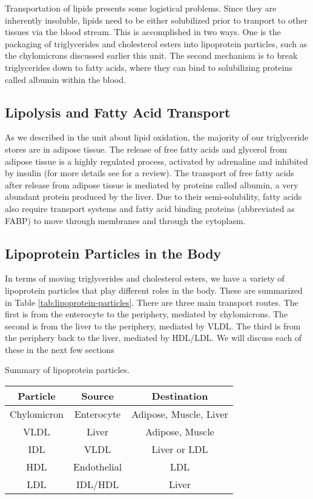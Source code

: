\documentclass{tufte-handout}
\begin{document}
Transportation of lipids presents some logistical problems.  Since they are inherently insoluble, lipids need to be either solubilized prior to tranport to other tissues via the blood stream.  This is accomplished in two ways.  One is the packaging of triglycerides and cholesterol esters into lipoprotein particles, such as the chylomicrons discussed earlier this unit.  The second mechanism is to break triglycerides down to fatty acids, where they can bind to solubilizing proteins called albumin within the blood.

\subsection{Lipolysis and Fatty Acid Transport}

As we described in the unit about lipid oxidation, the majority of our triglyceride stores are in adipose tissue.  The release of free fatty acids and glycerol from adipose tissue is a highly regulated process, activated by adrenaline and inhibited by insulin (for more details see \citet{Zechner2012} for a review).  The transport of free fatty acids after release from adipose tissue is mediated by proteins called albumin, a very abundant protein produced by the liver.  Due to their semi-solubility, fatty acids also require transport systems and fatty acid binding proteins (abbreviated as FABP) to move through membranes and through the cytoplasm.


\subsection{Lipoprotein Particles in the Body}

In terms of moving triglycerides and cholesterol esters, we have a variety of lipoprotein particles that play different roles in the body.  These are summarized in Table \ref{tab:lipoprotein-particles}.  There are three main transport routes.  The first is from the enterocyte to the periphery, mediated by chylomicrons.  The second is from the liver to the periphery, mediated by VLDL.  The third is from the periphery back to the liver, mediated by HDL/LDL.  We will discuss each of these in the next few sections

\begin{margintable}
\centering
\caption{Summary of lipoprotein particles.}
\label{tab:lipoprotein-particles}
\begin{tabular}{@{}ccc@{}}
\toprule
\textbf{Particle} & \textbf{Source} & \textbf{Destination}       \\ \midrule
Chylomicron       & Enterocyte      & Adipose, Muscle, Liver \\
VLDL              & Liver           & Adipose, Muscle            \\
IDL                 & VLDL          & Liver or LDL \\
HDL               & Endothelial     & LDL                        \\
LDL               & IDL/HDL             & Liver                      \\ \bottomrule
\end{tabular}
\end{margintable}
\end{document}
